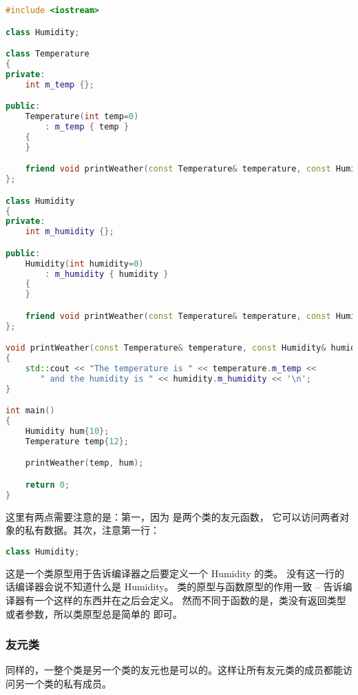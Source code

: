 \documentclass[../../LearnCpp.tex]{subfiles}
\begin{document}
\begin{lstlisting}[language=C++]
#include <iostream>

class Humidity;

class Temperature
{
private:
    int m_temp {};

public:
    Temperature(int temp=0)
        : m_temp { temp }
    {
    }

    friend void printWeather(const Temperature& temperature, const Humidity& humidity);
};

class Humidity
{
private:
    int m_humidity {};

public:
    Humidity(int humidity=0)
        : m_humidity { humidity }
    {
    }

    friend void printWeather(const Temperature& temperature, const Humidity& humidity);
};

void printWeather(const Temperature& temperature, const Humidity& humidity)
{
    std::cout << "The temperature is " << temperature.m_temp <<
       " and the humidity is " << humidity.m_humidity << '\n';
}

int main()
{
    Humidity hum{10};
    Temperature temp{12};

    printWeather(temp, hum);

    return 0;
}
\end{lstlisting}

这里有两点需要注意的是：第一，因为  是两个类的友元函数，
它可以访问两者对象的私有数据。其次，注意第一行：

\begin{lstlisting}[language=C++]
class Humidity;
\end{lstlisting}

这是一个类原型用于告诉编译器之后要定义一个 Humidity 的类。
没有这一行的话编译器会说不知道什么是 Humidity。
类的原型与函数原型的作用一致 -- 告诉编译器有一个这样的东西并在之后会定义。
然而不同于函数的是，类没有返回类型或者参数，所以类原型总是简单的  即可。

\subsubsection*{友元类}

同样的，一整个类是另一个类的友元也是可以的。这样让所有友元类的成员都能访问另一个类的私有成员。
\end{document}
